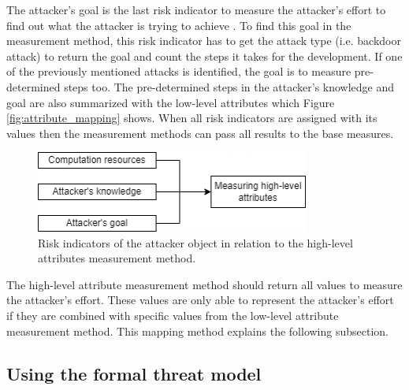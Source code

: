 The attacker's goal is the last risk indicator to measure the attacker's effort to find out what the attacker is trying to achieve \cite{DBLP:journals/corr/abs-2012-04884}. To find this goal in the measurement method, this risk indicator has to get the attack type (i.e. backdoor attack) to return the goal and count the steps it takes for the development. If one of the previously mentioned attacks is identified, the goal is to measure pre-determined steps too. The pre-determined steps in the attacker's knowledge and goal are also summarized with the low-level attributes which Figure \ref{fig:attribute_mapping} shows. When all risk indicators are assigned with its values then the measurement methods can pass all results to the base measures.

\begin{figure}[ht!]
  \centering
  \includegraphics[width=9cm]{pictures/measure_effort.png}
  \caption{Risk indicators of the attacker object in relation to the high-level attributes measurement method.}
  \label{fig:measure_effort}
\end{figure}

The high-level attribute measurement method should return all values to measure the attacker's effort. These values are only able to represent the attacker's effort if they are combined with specific values from the low-level attribute measurement method. This mapping method explains the following subsection.

\subsection{Using the formal threat model}
\label{sec:use_threat_model}

